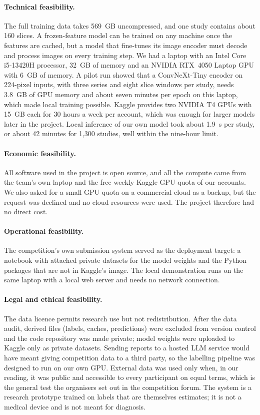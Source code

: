 \paragraph{Technical feasibility.} The full training data takes 569~GB uncompressed, and one study contains about 160 slices. A frozen-feature model can be trained on any machine once the features are cached, but a model that fine-tunes its image encoder must decode and process images on every training step. We had a laptop with an Intel Core i5-13420H processor, 32~GB of memory and an NVIDIA RTX~4050 Laptop GPU with 6~GB of memory. A pilot run showed that a ConvNeXt-Tiny encoder on 224-pixel inputs, with three series and eight slice windows per study, needs 3.8~GB of GPU memory and about seven minutes per epoch on this laptop, which made local training possible. Kaggle provides two NVIDIA T4 GPUs with 15~GB each for 30 hours a week per account, which was enough for larger models later in the project. Local inference of our own model took about 1.9~s per study, or about 42 minutes for 1,300 studies, well within the nine-hour limit.

\paragraph{Economic feasibility.} All software used in the project is open source, and all the compute came from the team's own laptop and the free weekly Kaggle GPU quota of our accounts. We also asked for a small GPU quota on a commercial cloud as a backup, but the request was declined and no cloud resources were used. The project therefore had no direct cost.

\paragraph{Operational feasibility.} The competition's own submission system served as the deployment target: a notebook with attached private datasets for the model weights and the Python packages that are not in Kaggle's image. The local demonstration runs on the same laptop with a local web server and needs no network connection.

\paragraph{Legal and ethical feasibility.} The data licence permits research use but not redistribution. After the data audit, derived files (labels, caches, predictions) were excluded from version control and the code repository was made private; model weights were uploaded to Kaggle only as private datasets. Sending reports to a hosted LLM service would have meant giving competition data to a third party, so the labelling pipeline was designed to run on our own GPU. External data was used only when, in our reading, it was public and accessible to every participant on equal terms, which is the general test the organisers set out in the competition forum. The system is a research prototype trained on labels that are themselves estimates; it is not a medical device and is not meant for diagnosis.

